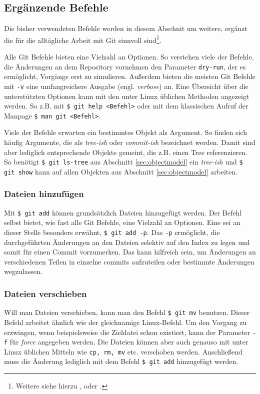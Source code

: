 \subsection{Ergänzende Befehle}\label{sec:commands}
Die bisher verwendeten Befehle werden in diesem Abschnit um weitere, ergänzt
die für die alltägliche Arbeit mit Git sinnvoll sind\footnote{Weitere siehe
hierzu \cite{gitosp}, \cite{progit} oder \cite{gitwf}.}.

Alle Git Befehle bieten eine Vielzahl an Optionen. So verstehen viele der
Befehle, die Änderungen an dem Repository vornehmen den Parameter
\texttt{\-{}\-{}dry-run}, der es ermöglicht, Vorgänge erst zu simulieren.
Außerdem bieten die meisten Git Befehle mit \texttt{-v} eine umfangreichere
Ausgabe (engl. \textit{verbose}) an. Eine Übersicht über die unterstützten
Optionen kann mit den unter Linux üblichen Methoden angezeigt werden. So z.B.
mit \texttt{\$ git help <Befehl>} oder mit dem klassischen Aufruf der Manpage
\texttt{\$ man git <Befehl>}.

Viele der Befehle erwarten ein bestimmtes Objekt als Argument. So finden sich
häufig Argumente, die als \textit{tree-ish} oder \textit{commit-ish} bezeichnet
werden. Damit sind aber lediglich entsprechende Objekte gemeint, die z.B. einen
Tree referenzieren. So benötigt \texttt{\$ git ls-tree} aus Abschnitt
\ref{sec:objectmodel} ein \textit{tree-ish} und \texttt{\$ git show} kann auf
allen Objekten aus Abschnitt \ref{sec:objectmodel} arbeiten. \cite[52]{gitosp}

\subsubsection{Dateien hinzufügen}\label{sec:gitadd}
Mit \texttt{\$ git add} können grundsätzlich Dateien hinzugefügt werden. Der
Befehl selbst bietet, wie fast alle Git Befehle, eine Vielzahl an Optionen.
Eine sei an dieser Stelle besonders erwähnt, \texttt{\$ git add -p}. Das
\texttt{-p} ermöglicht, die durchgeführten Änderungen an den Dateien selektiv
auf den Index zu legen und somit für einen Commit vorzumerken. Das kann
hilfreich sein, um Änderungen an verschiedenen Teilen in einzelne
\glspl{commit} aufzuteilen oder bestimmte Änderungen
wegzulassen. \cite[S.~36-37]{gitosp}

\subsubsection{Dateien verschieben} Will man Dateien verschieben, kann man den
Befehl \texttt{\$ git mv} benutzen. Dieser Befehl arbeitet ähnlich wie der
gleichnamige Linux-Befehl. Um den Vorgang zu erzwingen, wenn beispielsweise
die Zieldatei schon existiert, kann der Parameter \texttt{-f} für
\textit{force} angegeben werden. Die Dateien können aber auch genauso mit unter
Linux üblichen Mitteln wie \texttt{cp, rm, mv} etc. verschoben werden.
Anschließend muss die Änderung lediglich mit dem Befehl \texttt{\$ git add}
hinzugefügt werden.\cite[S.~43-44]{gitosp}

